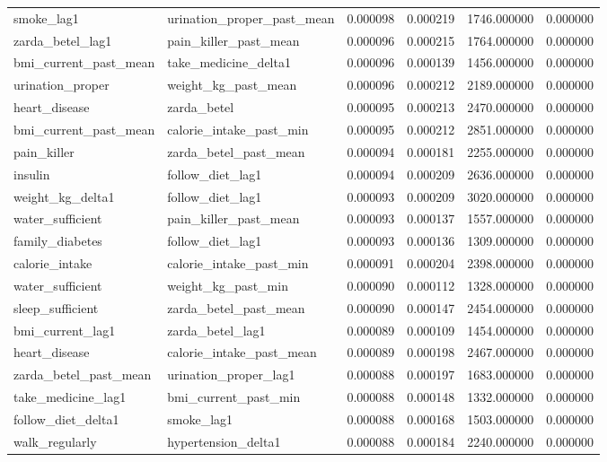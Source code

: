 \begin{longtable}{llrrrr}
smoke\_lag1 & urination\_proper\_past\_mean & 0.000098 & 0.000219 & 1746.000000 & 0.000000 \\
zarda\_betel\_lag1 & pain\_killer\_past\_mean & 0.000096 & 0.000215 & 1764.000000 & 0.000000 \\
bmi\_current\_past\_mean & take\_medicine\_delta1 & 0.000096 & 0.000139 & 1456.000000 & 0.000000 \\
urination\_proper & weight\_kg\_past\_mean & 0.000096 & 0.000212 & 2189.000000 & 0.000000 \\
heart\_disease & zarda\_betel & 0.000095 & 0.000213 & 2470.000000 & 0.000000 \\
bmi\_current\_past\_mean & calorie\_intake\_past\_min & 0.000095 & 0.000212 & 2851.000000 & 0.000000 \\
pain\_killer & zarda\_betel\_past\_mean & 0.000094 & 0.000181 & 2255.000000 & 0.000000 \\
insulin & follow\_diet\_lag1 & 0.000094 & 0.000209 & 2636.000000 & 0.000000 \\
weight\_kg\_delta1 & follow\_diet\_lag1 & 0.000093 & 0.000209 & 3020.000000 & 0.000000 \\
water\_sufficient & pain\_killer\_past\_mean & 0.000093 & 0.000137 & 1557.000000 & 0.000000 \\
family\_diabetes & follow\_diet\_lag1 & 0.000093 & 0.000136 & 1309.000000 & 0.000000 \\
calorie\_intake & calorie\_intake\_past\_min & 0.000091 & 0.000204 & 2398.000000 & 0.000000 \\
water\_sufficient & weight\_kg\_past\_min & 0.000090 & 0.000112 & 1328.000000 & 0.000000 \\
sleep\_sufficient & zarda\_betel\_past\_mean & 0.000090 & 0.000147 & 2454.000000 & 0.000000 \\
bmi\_current\_lag1 & zarda\_betel\_lag1 & 0.000089 & 0.000109 & 1454.000000 & 0.000000 \\
heart\_disease & calorie\_intake\_past\_mean & 0.000089 & 0.000198 & 2467.000000 & 0.000000 \\
zarda\_betel\_past\_mean & urination\_proper\_lag1 & 0.000088 & 0.000197 & 1683.000000 & 0.000000 \\
take\_medicine\_lag1 & bmi\_current\_past\_min & 0.000088 & 0.000148 & 1332.000000 & 0.000000 \\
follow\_diet\_delta1 & smoke\_lag1 & 0.000088 & 0.000168 & 1503.000000 & 0.000000 \\
walk\_regularly & hypertension\_delta1 & 0.000088 & 0.000184 & 2240.000000 & 0.000000 \\

\end{longtable}
